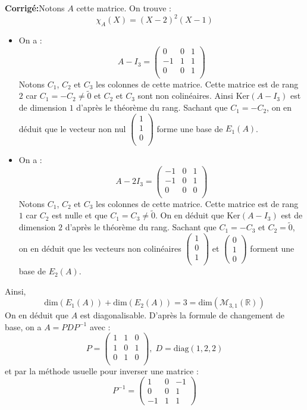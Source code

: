 \documentclass[a4paper,twoside,french,10pt]{VcCours}
\newcommand{\corr}{\textbf{Corrigé:}}
\begin{document}
\corr Notons $A$ cette matrice. On trouve :
$$ \chi_A(X) = (X-2)^2(X-1)$$
\begin{itemize}
\item On a : 
$$ A- I_3 = \begin{pmatrix}
0 & 0& 1 \\
-1 & 1 & 1 \\
0 & 0 & 1 \\
\end{pmatrix}$$
Notons $C_1$, $C_2$ et $C_3$ les colonnes de cette matrice. Cette matrice est de rang $2$ car $C_1=-C_2 \neq \tilde{0}$ et $C_2$ et $C_3$ sont non colinéaires. Ainsi $\textrm{Ker}(A-I_3)$ est de dimension $1$ d'après le théorème du rang. Sachant que $C_1=-C_2$, on en déduit que le vecteur non nul $\begin{pmatrix}
1 \\
1 \\
0 \\
\end{pmatrix}$ forme une base de $E_1(A)$.
\item On a : 
$$ A- 2I_3 = \begin{pmatrix}
-1 & 0& 1 \\
-1 & 0 & 1 \\
0 & 0 & 0 \\
\end{pmatrix}$$
Notons $C_1$, $C_2$ et $C_3$ les colonnes de cette matrice. Cette matrice est de rang $1$ car $C_2$ est nulle et que $C_1=C_3 \neq \tilde{0}$. On en déduit que $\textrm{Ker}(A-I_3)$ est de dimension $2$ d'après le théorème du rang. Sachant que $C_1=-C_3$ et $C_2= \tilde{0}$, on en déduit que les vecteurs non colinéaires $\begin{pmatrix}
1 \\
0 \\
1 \\
\end{pmatrix}$ et $\begin{pmatrix}
0 \\
1 \\
0
\end{pmatrix}$ forment une base de $E_2(A)$. 
\end{itemize}
Ainsi,
$$ \textrm{dim}(E_1(A))+ \textrm{dim}(E_2(A)) = 3 = \textrm{dim}(\mathcal{M}_{3,1}(\mathbb{R}))$$
On en déduit que $A$ est diagonalisable. D'après la formule de changement de base, on a $A = PDP^{-1}$ avec :
$$ P = \begin{pmatrix}
1 & 1 & 0\\
1 & 0 & 1 \\
0 & 1 & 0 \\
\end{pmatrix}, \; D=\textrm{diag}(1,2,2)$$
et par la méthode usuelle pour inverser une matrice :
$$ P^{-1} =  \begin{pmatrix}
1 & 0 & -1 \\
0 & 0 & 1 \\
-1 & 1 & 1 
\end{pmatrix}$$
\end{document}

